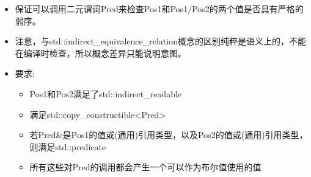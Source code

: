 
\begin{itemize}
\item
保证可以调用二元谓词Pred来检查Pos1和Pos1/Pos2的两个值是否具有严格的弱序。

\item
注意，与std::indirect\_equivalence\_relation概念的区别纯粹是语义上的，不能在编译时检查，所以概念差异只能说明意图。

\item
要求:
\begin{itemize}
\item
Pos1和Pos2满足了std::indirect\_readable

\item
满足std::copy\_constructible<Pred>

\item
若Pred\&是Pos1的值或(通用)引用类型，以及Pos2的值或(通用)引用类型，则满足std::predicate

\item
所有这些对Pred的调用都会产生一个可以作为布尔值使用的值
\end{itemize}
\end{itemize}










